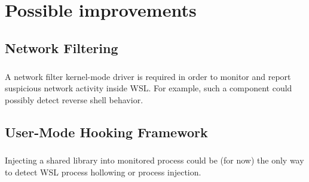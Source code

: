 \chapter{Possible improvements}
    \section{Network Filtering}
        \paragraph{}
        A network filter kernel-mode driver is required in order to monitor and report suspicious network activity inside WSL. For example, such
        a component could possibly detect reverse shell behavior.
    \section{User-Mode Hooking Framework}
        \paragraph{}
        Injecting a shared library into monitored process could be (for now) the only way to detect WSL process hollowing or process injection.
